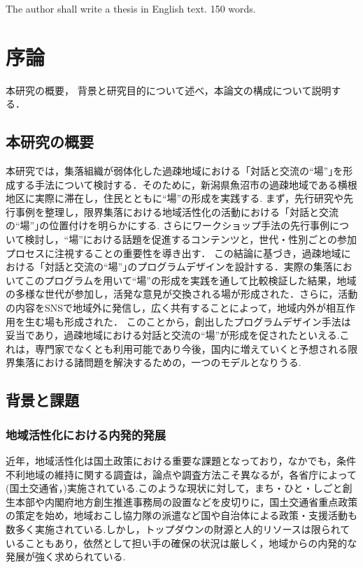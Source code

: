 \documentclass[a4paper]{jsarticle}
\begin{document}
The author shall write a thesis in English text. 150 words.

\makemokuji


\newpage

\setcounter{page}{1} %
\section{序論}
本研究の概要， 背景と研究目的について述べ，本論文の構成について説明する．
\subsection{本研究の概要}
本研究では，集落組織が弱体化した過疎地域における「対話と交流の“場”｣を形成する手法について検討する．そのために，新潟県魚沼市の過疎地域である横根地区に実際に滞在し，住民とともに“場”の形成を実践する.
まず，先行研究や先行事例を整理し，限界集落における地域活性化の活動における「対話と交流の“場”｣の位置付けを明らかにする. さらにワークショップ手法の先行事例について検討し，“場”における話題を促進するコンテンツと，世代・性別ごとの参加プロセスに注視することの重要性を導き出す．
この結論に基づき，過疎地域における「対話と交流の“場”｣のプログラムデザインを設計する．実際の集落においてこのプログラムを用いて“場”の形成を実践を通して比較検証した結果，地域の多様な世代が参加し，活発な意見が交換される場が形成された．さらに，活動の内容をSNSで地域外に発信し，広く共有することによって，地域内外が相互作用を生む場も形成された．
このことから，創出したプログラムデザイン手法は妥当であり，過疎地域における対話と交流の“場”が形成を促されたといえる.これは，専門家でなくとも利用可能であり今後，国内に増えていくと予想される限界集落における諸問題を解決するための，一つのモデルとなりうる.
\subsection{背景と課題}
\subsubsection{地域活性化における内発的発展}
近年，地域活性化は国土政策における重要な課題となっており，なかでも，条件不利地域の維持に関する調査は，論点や調査方法こそ異なるが，各省庁によって(国土交通省\cite{1}，)実施されている.このような現状に対して，まち・ひと・しごと創生本部や内閣府地方創生推進事務局の設置などを皮切りに，国土交通省重点政策\cite{2}の策定を始め，地域おこし協力隊の派遣など国や自治体による政策・支援活動も数多く実施されている.しかし，トップダウンの財源と人的リソースは限られていることもあり，依然として担い手の確保の状況は厳しく，地域からの内発的な発展が強く求められている.
\end{document}
